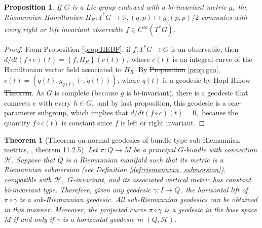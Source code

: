 \documentclass[12pt, letterpaper, reqno]{amsart}
\theoremstyle{definition}
\theoremstyle{plain}
\newtheorem{prop}{Proposition}
\newtheorem{thm}{Theorem}
\theoremstyle{remark}
\providecommand{\DIFadd}[1]{{\protect\color{blue}\uwave{#1}}} %
\providecommand{\DIFdel}[1]{{\protect\color{red}\sout{#1}}}                      %
\providecommand{\DIFaddbegin}{} %
\providecommand{\DIFaddend}{} %
\providecommand{\DIFdelbegin}{} %
\providecommand{\DIFdelend}{} %
\newcommand{\DIFscaledelfig}{0.5}
\newlength{\DIFdelgraphicswidth} %
\newlength{\DIFdelgraphicsheight} %
\newcommand{\DIFaddincludegraphics}[2][]{{\color{blue}\fbox{\DIFOincludegraphics[#1]{#2}}}} %
\newcommand{\DIFdelincludegraphics}[2][]{%
\sbox{\DIFdelgraphicsbox}{\DIFOincludegraphics[#1]{#2}}%
\settoboxwidth{\DIFdelgraphicswidth}{\DIFdelgraphicsbox} %
\settoboxtotalheight{\DIFdelgraphicsheight}{\DIFdelgraphicsbox} %
\scalebox{\DIFscaledelfig}{%
\parbox[b]{\DIFdelgraphicswidth}{\usebox{\DIFdelgraphicsbox}\\[-\baselineskip] \rule{\DIFdelgraphicswidth}{0em}}\llap{\resizebox{\DIFdelgraphicswidth}{\DIFdelgraphicsheight}{%
\setlength{\unitlength}{\DIFdelgraphicswidth}%
\begin{picture}(1,1)%
\thicklines\linethickness{2pt} %
{\color[rgb]{1,0,0}\put(0,0){\framebox(1,1){}}}%
{\color[rgb]{1,0,0}\put(0,0){\line( 1,1){1}}}%
{\color[rgb]{1,0,0}\put(0,1){\line(1,-1){1}}}%
\end{picture}%
}\hspace*{3pt}}} %
} %
\DeclareRobustCommand{\DIFaddbegin}{\DIFOaddbegin \let\includegraphics\DIFaddincludegraphics} %
\DeclareRobustCommand{\DIFaddend}{\DIFOaddend \let\includegraphics\DIFOincludegraphics} %
\DeclareRobustCommand{\DIFdelbegin}{\DIFOdelbegin \let\includegraphics\DIFdelincludegraphics} %
\DeclareRobustCommand{\DIFdelend}{\DIFOaddend \let\includegraphics\DIFOincludegraphics} %
\begin{document}
\begin{prop}\label{prop:essential_fact2}
	If $ G $ is a Lie group endowed with a bi-invariant metric $ g, $ the Riemannian Hamiltonian $ H_R : T^*G \rightarrow \mathbb{R}, (q,p) \mapsto g_q(p,p)/2$ commutes with every right or left invariant observable $ f\in C^\infty ( T^*G). $ 
\end{prop}
\begin{proof}
	From \DIFdelbegin \DIFdel{Proposition }\DIFdelend \DIFaddbegin \DIFadd{proposition }\DIFaddend \ref{prop:HEBF}, if $ f: T^*G \rightarrow G $ is an observable, then $ d/dt \left( f\circ c \right) (t)= \left\{ f, H_R \right\}(c(t)),  $ where $ c(t) $ is an integral curve of the Hamiltonian vector field associated to $ H_R. $ By \DIFdelbegin \DIFdel{Proposition }\DIFdelend \DIFaddbegin \DIFadd{proposition }\DIFaddend \ref{prop:geo}, $ c(t)=(q(t), g_{q(t)}(\cdot, \dot{q}(t))) $, where $ q(t) $ is a geodesic by Hopf-Rinow \DIFdelbegin \DIFdel{Theorem}\DIFdelend \DIFaddbegin \DIFadd{theorem}\DIFaddend . As $ G $ is complete (because $ g $ is bi-invariant), there is a geodesic that connects $ e $ with every $ h\in G, $ and by last proposition, this geodesic is a one-parameter subgroup, which implies that $ d/dt(f\circ c)(t)=0, $ because the quantity $ f\circ c(t) $ is constant since $ f $ is left or right invariant.	
\end{proof}

\begin{thm}[Theorem on normal geodesics of bundle type sub-Riemannian metrics, \cite{montgomery2002tour}, theorem 11.2.5]\label{thm:normal_geodesics}
	Let $ \pi: Q \rightarrow M $ be a principal $ G $-bundle with connection $ \mathcal{H}. $ Suppose that $ Q $ is a Riemannian manifold such that its metric is a Riemannian submersion (see Definition \ref{def:riemannian_submersion}), compatible with $ \mathcal{H}, $ $ G $-invariant, and its associated vertical metric has constant bi-invariant type. Therefore, given any geodesic $\gamma: I \rightarrow Q, $ the horizontal lift of $ \pi\circ\gamma $ is a sub-Riemannian geodesic. All sub-Riemannian geodesics can be obtained in this manner. Moreover, the projected curve $ \pi\circ\gamma$ is a geodesic in the base space $ M $ if and only if $ \gamma $ is a horizontal geodesic in $ (Q, \mathcal{H}). $ 
\end{thm}
\end{document}
